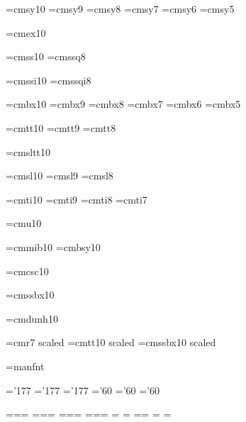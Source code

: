 \font\tensy=cmsy10 %
\font\preloaded=cmsy9
\font\preloaded=cmsy8
\font\sevensy=cmsy7
\font\preloaded=cmsy6
\font\fivesy=cmsy5

\font\tenex=cmex10 %

\font\preloaded=cmss10 %
\font\preloaded=cmssq8

\font\preloaded=cmssi10 %
\font\preloaded=cmssqi8

\font\tenbf=cmbx10 %
\font\preloaded=cmbx9
\font\preloaded=cmbx8
\font\sevenbf=cmbx7
\font\preloaded=cmbx6
\font\fivebf=cmbx5

\font\tentt=cmtt10 %
\font\preloaded=cmtt9
\font\preloaded=cmtt8

\font\preloaded=cmsltt10 %

\font\tensl=cmsl10 %
\font\preloaded=cmsl9
\font\preloaded=cmsl8

\font\tenit=cmti10 %
\font\preloaded=cmti9
\font\preloaded=cmti8
\font\preloaded=cmti7

\font\preloaded=cmu10 %

\font\preloaded=cmmib10 %
\font\preloaded=cmbsy10 %

\font\preloaded=cmcsc10 %

\font\preloaded=cmssbx10 %

\font\preloaded=cmdunh10 %

\font\preloaded=cmr7 scaled  %
\font\preloaded=cmtt10 scaled 
\font\preloaded=cmssbx10 scaled 

\font\preloaded=manfnt %


\let\preloaded=\undefined %

\skewchar\teni='177 \skewchar\seveni='177 \skewchar\fivei='177
\skewchar\tensy='60 \skewchar\sevensy='60 \skewchar\fivesy='60

=\tenrm {}=\sevenrm {}=\fiverm
\def\rm{\fam\z@\tenrm}
=\teni {}=\seveni {}=\fivei
\def\mit{\fam\@ne} \def\oldstyle{\fam\@ne\teni}
=\tensy {}=\sevensy {}=\fivesy
\def\cal{\fam\tw@}
=\tenex {}=\tenex {}=\tenex
\newfam\itfam \def\it{\fam\itfam\tenit} %
\textfont\itfam=\tenit
\newfam\slfam \def\sl{\fam\slfam\tensl} %
\textfont\slfam=\tensl
\newfam\bffam \def\bf{\fam\bffam\tenbf} %
\textfont\bffam=\tenbf \scriptfont\bffam=\sevenbf
\scriptscriptfont\bffam=\fivebf
\newfam\ttfam \def\tt{\fam\ttfam\tentt} %
\textfont\ttfam=\tentt


